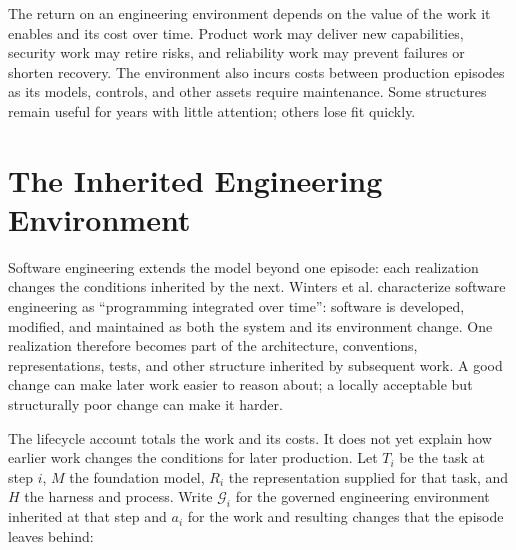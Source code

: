 
The return on an engineering environment depends on the value of the work it enables and its cost over time. Product work may deliver new capabilities, security work may retire risks, and reliability work may prevent failures or shorten recovery. The environment also incurs costs between production episodes as its models, controls, and other assets require maintenance. Some structures remain useful for years with little attention; others lose fit quickly.

\section{The Inherited Engineering Environment}\label{heading:the-dynamic-model}


Software engineering extends the model beyond one episode: each realization changes the conditions inherited by the next. Winters et al. characterize software engineering as ``programming integrated over time'': software is developed, modified, and maintained as both the system and its environment change\citep{winters2020}. One realization therefore becomes part of the architecture, conventions, representations, tests, and other structure inherited by subsequent work. A good change can make later work easier to reason about; a locally acceptable but structurally poor change can make it harder.


The lifecycle account totals the work and its costs. It does not yet explain how earlier work changes the conditions for later production. Let \(T_i\) be the task at step \(i\), \(M\) the foundation model, \(R_i\) the representation supplied for that task, and \(H\) the harness and process. Write \(\mathcal{G}_i\) for the governed engineering environment inherited at that step and \(a_i\) for the work and resulting changes that the episode leaves behind:

